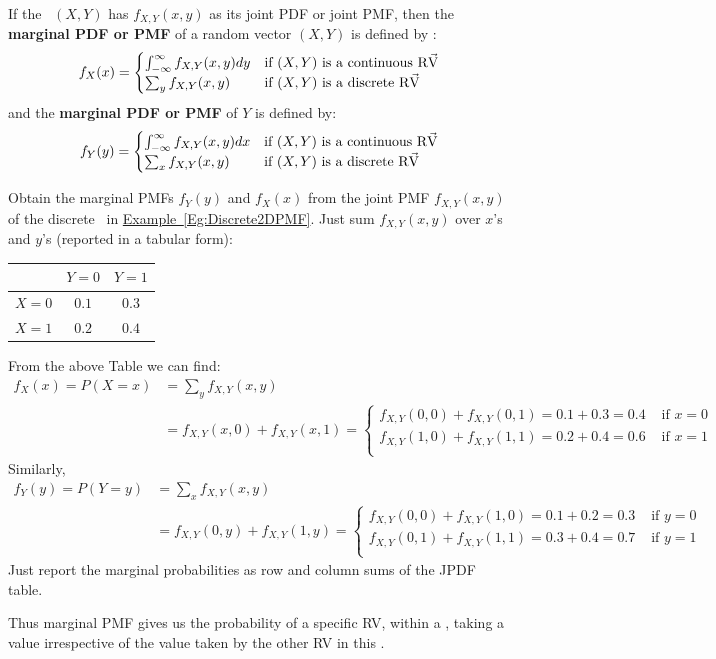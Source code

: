 \begin{definition}
If the \rv~$(X,Y)$ has $f_{X,Y}(x,y)$ as its joint PDF or joint PMF, then the 
{\bf marginal PDF or PMF} of a random vector $(X,Y)$ is defined by :
\[
f_{X}(x) =
\begin{cases}
\int_{-\infty}^{\infty} f_{X,Y}(x,y) dy & \text{if $(X,Y)$ is a continuous {\mbox{R$\vec{\text V}$}}}  \\
\sum_{y} f_{X,Y}(x,y) & \text{if $(X,Y)$ is a discrete {\mbox{R$\vec{\text V}$}}} \\
\end{cases}
\]
and the  {\bf marginal PDF or PMF} of $Y$ is defined by:
\[
f_{Y}(y) = 
\begin{cases}
\int_{-\infty}^{\infty} f_{X,Y}(x,y) dx & \text{if $(X,Y)$ is a continuous {\mbox{R$\vec{\text V}$}}}  \\
\sum_{x} f_{X,Y}(x,y) & \text{if $(X,Y)$ is a discrete {\mbox{R$\vec{\text V}$}}} \\
\end{cases}
\]
\end{definition}

\begin{example}
Obtain the marginal PMFs $f_Y(y)$ and $f_X(x)$ from the joint PMF $f_{X,Y}(x,y)$ of the discrete \rv~in \hyperref[Eg:Discrete2DPMF]{Example~\ref*{Eg:Discrete2DPMF}}.
Just sum $f_{X,Y}(x,y)$ over $x$'s and $y$'s (reported in a tabular form):
\begin{center}
\begin{tabular}{|c|c c|}
\hline
& $Y=0$ & $Y=1$ \\ \hline
$X=0$& $0.1$ & $0.3$  \\
$X=1$& $0.2$ & $0.4$  \\ \hline
\end{tabular}
\end{center}
From the above Table we can find:
\begin{align*}
f_X(x) = P(X=x) 
&= \sum_{y} f_{X,Y}(x,y) \\
&= 
f_{X,Y}(x,0) + f_{X,Y}(x,1) = 
\begin{cases}
f_{X,Y}(0,0) + f_{X,Y}(0,1) = 0.1+0.3=0.4 & \text{ if } x=0\\
f_{X,Y}(1,0) + f_{X,Y}(1,1) = 0.2+0.4=0.6 & \text{ if } x=1\\
\end{cases}
\end{align*}
Similarly,
\begin{align*}
f_Y(y) = P(Y=y) 
&= \sum_{x} f_{X,Y}(x,y) \\
&= 
f_{X,Y}(0,y) + f_{X,Y}(1,y) 
= 
\begin{cases}
f_{X,Y}(0,0) + f_{X,Y}(1,0) = 0.1+0.2=0.3 & \text{ if } y=0\\
f_{X,Y}(0,1) + f_{X,Y}(1,1) = 0.3+0.4=0.7 & \text{ if } y=1\\
\end{cases}
\end{align*}
Just report the marginal probabilities as row and column sums of the JPDF table.

Thus marginal PMF gives us the probability of a specific RV, within a \rv, taking a value irrespective of the value taken by the other RV in this \rv. 
\end{example}

